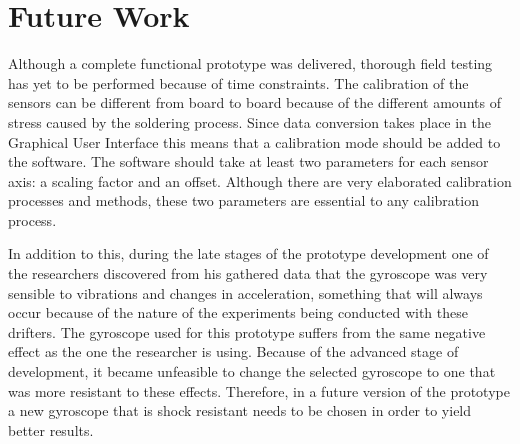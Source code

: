 \section{Future Work}

Although a complete functional prototype was delivered, thorough field testing has yet to be performed because of time constraints.   The calibration of the sensors can be different from board to board because of the different amounts of stress caused by the soldering process.  Since data conversion takes place in the Graphical User Interface this means that a calibration mode should be added to the software.  The software should take at least two parameters for each sensor axis: a scaling factor and an offset.  Although there are very elaborated calibration processes and methods, these two parameters are essential to any calibration process. 

In addition to this, during the late stages of the prototype development one of the researchers discovered from his gathered data that the gyroscope was very sensible to vibrations and changes in acceleration, something that will always occur because of the nature of the experiments being conducted with these drifters.  The gyroscope used for this prototype suffers from the same negative effect as the one the researcher is using.  Because of the advanced stage of development, it became unfeasible to change the selected gyroscope to one that was more resistant to these effects. Therefore, in a future version of the prototype a new gyroscope that is shock resistant needs to be chosen in order to yield better results.
